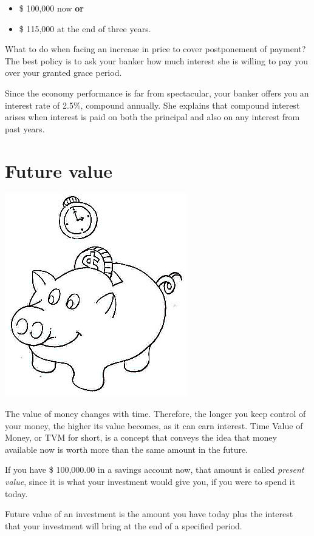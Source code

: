 \documentclass[a4paper,12pt]{book}
\begin{document}
\begin{itemize}
	\item \$ 100,000 now {\bf or}
	\item \$ 115,000 at the end of three years.
\end{itemize}

What to do when facing an increase in price
to cover postponement of payment? The best
policy is to ask your banker how much interest
she is willing to pay you over your
granted grace period.

Since the economy performance is far
from spectacular, your banker offers you
an interest rate of 2.5\%, compound annually.
She explains that compound interest arises
when interest is paid on both the principal
and also on any interest from past years.

\section{Future value}

\includegraphics{figs-prefix/piggy.jpg}

The value of money changes with time. Therefore,
the longer you keep control of your money,
the higher its value becomes, as it can earn
interest. Time Value of Money, or TVM for short,
is a concept that conveys the idea that money
available now is worth more than the same
amount in the future.

If you have \$ 100,000.00 in a savings account
now, that amount is called {\em present value},
since it is what your investment would give you,
if you were to spend it today.

Future value of an investment is the amount
you have today plus the interest that your
investment will bring at the end of a
specified period.
\end{document}

